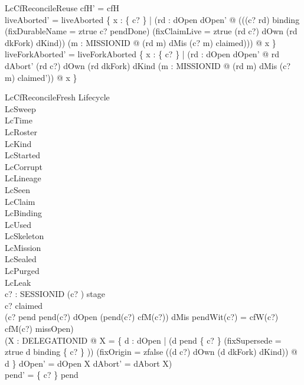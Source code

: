\documentclass[a4paper,10pt,fleqn]{article}
\begin{document}
\begin{schema}{LcCfReconcileReuse}
cfH' = cfH \\
liveAborted' = liveAborted \cup \{ x : \{ c? \} | (\exists rd : dOpen \setminus dOpen' @ (((c? \mapsto rd) \in binding \lor (fixDurableName = ztrue \land c? \in pendDone) \lor (fixClaimLive = ztrue \land (rd \mapsto c?) \in dOwn \land (rd \mapsto dkFork) \in dKind)) \land (\exists m : MISSIONID @ (rd \mapsto m) \in dMis \land (c? \mapsto m) \in claimed))) @ x \} \\
liveForkAborted' = liveForkAborted \cup \{ x : \{ c? \} | (\exists rd : dOpen \setminus dOpen' @ rd \in dAbort' \land (rd \mapsto c?) \in dOwn \land (rd \mapsto dkFork) \in dKind \land (\exists m : MISSIONID @ (rd \mapsto m) \in dMis \land (c? \mapsto m) \in claimed')) @ x \}
\end{schema}

\begin{schema}{LcCfReconcileFresh}
\Delta Lifecycle \\
\Xi LcSweep \\
\Xi LcTime \\
\Xi LcRoster \\
\Xi LcKind \\
\Xi LcStarted \\
\Xi LcCorrupt \\
\Xi LcLineage \\
\Xi LcSeen \\
\Xi LcClaim \\
\Xi LcBinding \\
\Xi LcUsed \\
\Xi LcSkeleton \\
\Xi LcMission \\
\Xi LcSealed \\
\Xi LcPurged \\
\Xi LcLeak \\
c? : SESSIONID
\where
(c? ) \in stage \\
c? \notin \dom claimed \\
\lnot (c? \in \dom pend \land pend(c?) \in dOpen \land (pend(c?) \mapsto cfM(c?)) \in dMis \land pendWit(c?) = cfW(c?) \land cfM(c?) \in missOpen) \\
(\exists X : \power DELEGATIONID @ X = \{ d : dOpen | (d \in pend \limg \{ c? \} \rimg \lor (fixSupersede = ztrue \land d \in binding \limg \{ c? \} \rimg)) \land (fixOrigin = zfalse \lor ((d \mapsto c?) \in dOwn \land (d \mapsto dkFork) \in dKind)) @ d \} \land dOpen' = dOpen \setminus X \land dAbort' = dAbort \cup X) \\
pend' = \{ c? \} \ndres pend \\

\end{schema}
\end{document}
